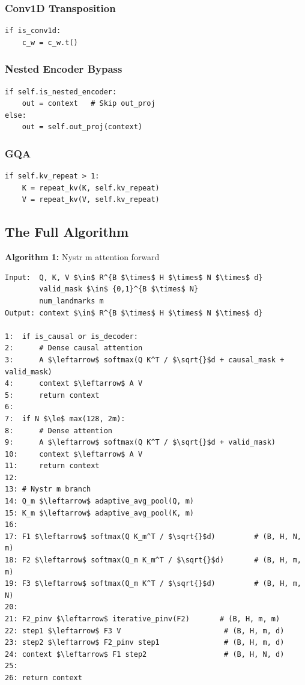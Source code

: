 \subsubsection{Conv1D Transposition}

\begin{lstlisting}
if is_conv1d:
    c_w = c_w.t()
\end{lstlisting}

\subsubsection{Nested Encoder Bypass}

\begin{lstlisting}
if self.is_nested_encoder:
    out = context   # Skip out_proj
else:
    out = self.out_proj(context)
\end{lstlisting}

\subsubsection{GQA}

\begin{lstlisting}
if self.kv_repeat > 1:
    K = repeat_kv(K, self.kv_repeat)
    V = repeat_kv(V, self.kv_repeat)
\end{lstlisting}

\subsection{The Full Algorithm}

\textbf{Algorithm 1:} Nystr m attention forward
\begin{lstlisting}
Input:  Q, K, V $\in$ R^{B $\times$ H $\times$ N $\times$ d}
        valid_mask $\in$ {0,1}^{B $\times$ N}
        num_landmarks m
Output: context $\in$ R^{B $\times$ H $\times$ N $\times$ d}

1:  if is_causal or is_decoder:
2:      # Dense causal attention
3:      A $\leftarrow$ softmax(Q K^T / $\sqrt{}$d + causal_mask + valid_mask)
4:      context $\leftarrow$ A V
5:      return context
6:
7:  if N $\le$ max(128, 2m):
8:      # Dense attention
9:      A $\leftarrow$ softmax(Q K^T / $\sqrt{}$d + valid_mask)
10:     context $\leftarrow$ A V
11:     return context
12:
13: # Nystr m branch
14: Q_m $\leftarrow$ adaptive_avg_pool(Q, m)
15: K_m $\leftarrow$ adaptive_avg_pool(K, m)
16:
17: F1 $\leftarrow$ softmax(Q K_m^T / $\sqrt{}$d)         # (B, H, N, m)
18: F2 $\leftarrow$ softmax(Q_m K_m^T / $\sqrt{}$d)       # (B, H, m, m)
19: F3 $\leftarrow$ softmax(Q_m K^T / $\sqrt{}$d)         # (B, H, m, N)
20:
21: F2_pinv $\leftarrow$ iterative_pinv(F2)       # (B, H, m, m)
22: step1 $\leftarrow$ F3 V                        # (B, H, m, d)
23: step2 $\leftarrow$ F2_pinv step1               # (B, H, m, d)
24: context $\leftarrow$ F1 step2                  # (B, H, N, d)
25:
26: return context
\end{lstlisting}

